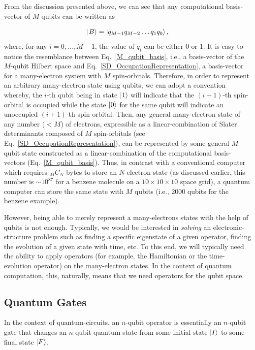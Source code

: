 \documentclass[12pt,oneside]{book}
\begin{document}
From the discussion presented above, we can see that any computational basis-vector of $M$ qubits can be written as

\begin{align}\label{M_qubit_basis}
    \ket{B} = \ket{q_{M-1}q_{M-2}\hdots q_1 q_0},
\end{align}
where, for any $i=0,\hdots,M-1$, the value of $q_i$ can be either 0 or 1. It is easy to notice the resemblance between Eq.~\ref{M_qubit_basis}, i.e., a basis-vector of the $M$-qubit Hilbert space and Eq.~\ref{SD_OccupationRepresentation}, a basis-vector for a many-electron system with $M$ spin-orbitals. Therefore, in order to represent an arbitrary many-electron state using qubits, we can adopt a convention whereby, the $i$-th qubit being in state $\ket{1}$ will indicate that the $(i+1)$-th spin-orbital is occupied while the state $\ket{0}$ for the same qubit will indicate an unoccupied $(i+1)$-th spin-orbital. Then, any general many-electron state of any number ($<M$) of electrons, expressible as a linear-combination of Slater determinants composed of $M$ spin-orbitals (see Eq.~\ref{SD_OccupationRepresentation}), can be represented by some general $M$-qubit state constructed as a linear-combination of the computational basis-vectors (Eq.~\ref{M_qubit_basis}). Thus, in contrast with a conventional computer which requires $_MC_N$ bytes to store an $N$-electron state (as discussed earlier, this number is $\sim 10^{87}$ for a benzene molecule on a $10 \times 10 \times 10$ space grid), a quantum computer can store the same state with $M$ qubits (i.e., 2000 qubits for the benzene example).

However, being able to merely represent a many-electrons states with the help of qubits is not enough. Typically, we would be interested in \textit{solving} an electronic-structure problem such as finding a specific eigenstate of a given operator, finding the evolution of a given state with time, etc. To this end, we will typically need the ability to apply operators (for example, the Hamiltonian or the time-evolution operator) on the many-electron states. In the context of quantum computation, this, naturally, means that we need operators for the qubit space. 

\subsection*{Quantum Gates}

In the context of quantum-circuits, an $n$-qubit operator is essentially an $n$-qubit gate that changes an $n$-qubit quantum state from some initial state $\ket{I}$ to some final state $\ket{F}$.
\end{document}
